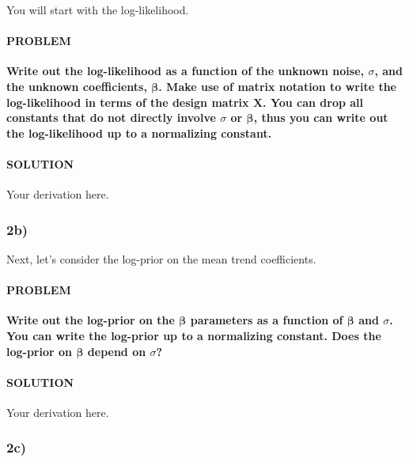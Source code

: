 \documentclass[
]{article}
\begin{document}
You will start with the log-likelihood.

\hypertarget{problem-7}{%
\paragraph{PROBLEM}\label{problem-7}}

\textbf{Write out the log-likelihood as a function of the unknown noise,
\(\sigma\), and the unknown coefficients, \(\boldsymbol{\beta}\). Make
use of matrix notation to write the log-likelihood in terms of the
design matrix \(\mathbf{X}\). You can drop all constants that do not
directly involve \(\sigma\) or \(\boldsymbol{\beta}\), thus you can
write out the log-likelihood up to a normalizing constant.}

\hypertarget{solution-7}{%
\paragraph{SOLUTION}\label{solution-7}}

Your derivation here.

\hypertarget{b-1}{%
\subsubsection{2b)}\label{b-1}}

Next, let's consider the log-prior on the mean trend coefficients.

\hypertarget{problem-8}{%
\paragraph{PROBLEM}\label{problem-8}}

\textbf{Write out the log-prior on the \(\boldsymbol{\beta}\) parameters
as a function of \(\boldsymbol{\beta}\) and \(\sigma\). You can write
the log-prior up to a normalizing constant. Does the log-prior on
\(\boldsymbol{\beta}\) depend on \(\sigma\)?}

\hypertarget{solution-8}{%
\paragraph{SOLUTION}\label{solution-8}}

Your derivation here.

\hypertarget{c-1}{%
\subsubsection{2c)}\label{c-1}}
\end{document}
